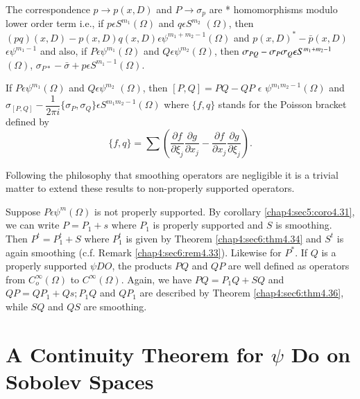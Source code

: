 \setcounter{coro}{37}
\begin{coro}\label{chap4:sec6:coro4.38}%
  The correspondence $p \to p(x,D)$ and $P \to \sigma_p$ are *
  homomorphisms modulo lower order term i.e., if $p \epsilon
  S^{m_1}(\Omega)$ and $q \epsilon S^{m_2}$ $(\Omega)$, then
  $(pq)(x,D)- p(x,D)q(x,D) \epsilon \psi^{m_1 +m_2-1}(\Omega)$ and
  $p (x,D)^*-\bar{p}(x,D)$ $\epsilon \psi ^{m_1-1}$ and also, if $P
  \epsilon \psi ^{m_1}(\Omega) $ and $Q \epsilon
  \psi^{m_2}(\Omega)$, then $\sigma_{P Q} -\sigma_P \sigma_{Q}\break
  \epsilon S^{m_1+m_2-1}$ $(\Omega)$, $\sigma_{P*}-\bar{\sigma}+p
  \epsilon S^{m_1-1} (\Omega)$.
\end{coro}

\begin{coro}\label{chap4:sec6:coro4.39}%
  If $P \epsilon \psi ^{m_1}(\Omega)$ and $Q \epsilon
  \psi^{m_2}$ $(\Omega)$, then $[P,Q]=P Q-QP$ $\epsilon$ $\psi^{m_1m_2-1}
  (\Omega)$ and $\sigma_{[P, Q]}- \dfrac {1}{2 \pi i} \{ \sigma_P
 , \sigma _ {Q}\}  \epsilon S^{m_1m_2-1}(\Omega)$ where $\{ f,q \}$
  stands for the Poisson bracket defined by  
  $$
  \{ f, q \} = \sum \left(\frac {\partial f}{\partial \xi_j}\frac {\partial
    g}{\partial x_j} - \frac {\partial f}{\partial x_j}\frac {\partial
    g}{\partial \xi_j}\right). 
  $$
\end{coro}
Following the philosophy that smoothing operators are negligible it is
a trivial matter to extend these results to non-properly supported
operators. 

Suppose $P \epsilon \psi ^m (\Omega)$ is not properly
supported. By corollary \ref{chap4:sec5:coro4.31}, we can write $P=P_1+s$ where $P_1$ is
properly supported and $S$ is smoothing. Then $P^t=P^t_1+S$ where
$P_1^t$ is given by Theorem \ref{chap4:sec6:thm4.34} and $S^t$ is
again smoothing 
(c.f. Remark \ref{chap4:sec6:rem4.33}). Likewise for $P^*$. If $Q$ is a properly
supported $\psi DO$, the products $P Q$ and $QP$ are well defined as
operators from $C^ \infty _o (\Omega)$ to $C^\infty (\Omega)$. Again,
we have $P Q= P_1 Q+S Q$ and $QP= QP_1+ Qs; P_1 Q$ and $QP_1$ are
described by Theorem \ref{chap4:sec6:thm4.36}, while $SQ$ and $QS$ are
smoothing.  

\section[A Continuity Theorem for $\psi$ Do on Sobolev
  Spaces]{A Continuity Theorem for $\psi$ Do on Sobolev\hfill\break
  Spaces}\label{chap4:sec7} %

